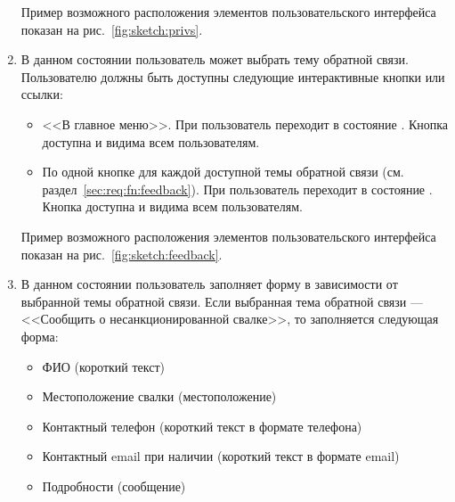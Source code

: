 \begin{enumerate}
            Пример возможного расположения элементов пользовательского интерфейса показан на
            рис.~\ref{fig:sketch:privs}.

        \item \label{itm:req:ui:states:feedback}

            В данном состоянии пользователь может выбрать тему обратной связи.
            Пользователю должны быть доступны следующие интерактивные кнопки или ссылки:
            \begin{itemize}
                \item
                    <<В главное меню>>.
                    При  пользователь переходит в состояние
                    \hyperref[itm:req:ui:states:mainmenu]
                    {}.
                    Кнопка доступна и видима всем пользователям.
                \item
                    По одной кнопке для каждой доступной темы обратной связи
                    (см. раздел~\ref{sec:req:fn:feedback}).
                    При  пользователь переходит в состояние
                    \hyperref[itm:req:ui:states:feedbackx]
                    {}.
                    Кнопка доступна и видима всем пользователям.
            \end{itemize}

            Пример возможного расположения элементов пользовательского интерфейса показан на
            рис.~\ref{fig:sketch:feedback}.

        \item \label{itm:req:ui:states:feedbackx}

            В данном состоянии пользователь заполняет форму в зависимости от выбранной темы
            обратной связи.
            Если выбранная тема обратной связи --- <<Сообщить о несанкционированной свалке>>,
            то заполняется следующая форма:
            \begin{itemize}
                \item
                    ФИО (короткий текст)
                \item
                    Местоположение свалки (местоположение)
                \item
                    Контактный телефон (короткий текст в формате телефона)
                \item
                    Контактный email при наличии (короткий текст в формате email)
                \item
                    Подробности (сообщение)
            \end{itemize}


\end{enumerate}
